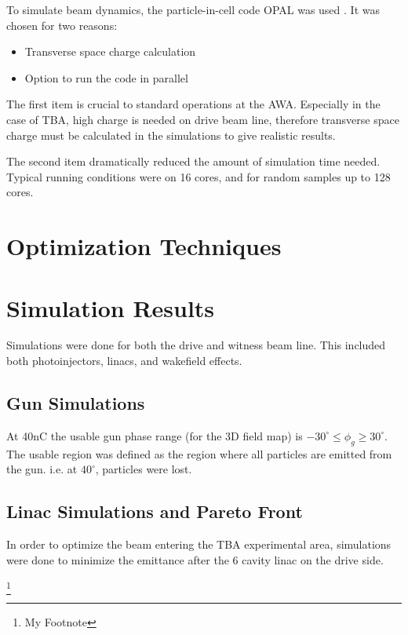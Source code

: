 \documentclass{iitthesis}
\begin{document}
To simulate beam dynamics, the particle-in-cell code OPAL was used \cite{opal}. 
It was chosen for two reasons:
\begin{itemize}
	\item Transverse space charge calculation 
	\item Option to run the code in parallel
\end{itemize} 

The first item is crucial to standard operations at the AWA. Especially in the 
case of TBA, high charge is needed on drive beam line, therefore transverse 
space charge must be calculated in the simulations to give realistic results.

The second item dramatically reduced the amount of simulation time needed. 
Typical running conditions were on 16 cores, and for random samples up to 128 cores.

\section{Optimization Techniques}

\section{Simulation Results}
Simulations were done for both the drive and witness beam line. 
This included both photoinjectors, linacs, and wakefield effects. 

\subsection{Gun Simulations}
At 40nC the usable gun phase range (for the 3D field map) is 
$-30^\circ \le \phi_g \ge 30^\circ$. The usable region was defined 
as the region where all particles are emitted from the gun. 
i.e. at $40^\circ$, particles were lost.  

\subsection{Linac Simulations and Pareto Front}
In order to optimize the beam entering the TBA experimental area, 
simulations were done to minimize the emittance after the 6 cavity linac
on the drive side. 


\footnote{My Footnote} 


\end{document}
